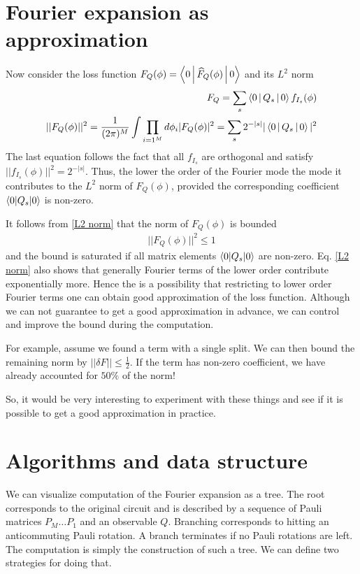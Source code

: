 \documentclass[12 pt]{article}
\begin{document}
\section{Fourier expansion as approximation}
Now consider the loss function $F_Q(\phi)=\Braket{0|\widehat{F}_Q(\phi)|0}$ and its $L^2$ norm
\begin{align}
	F_Q=\sum_s \Braket{0|Q_s|0} f_{I_s}(\phi)\\
	||F_Q(\phi)||^2=\frac{1}{(2\pi)^M}\int \prod_{i=1^M}d\phi_i|F_Q(\phi)|^2=\sum_s 2^{-|s|}|\Braket{0|Q_s|0}|^2  \label{L2 norm}
\end{align}
The last equation follows the fact that all $f_{I_s}$ are orthogonal and satisfy $||f_{I_s}(\phi)||^2=2^{-|s|}$.
Thus, the lower the order of the Fourier mode the mode it contributes to the $L^2$ norm of $F_Q(\phi)$, provided the corresponding coefficient $\braket{0|Q_s|0}$ is non-zero.

It follows from \eqref{L2 norm} that the norm of $F_Q(\phi)$ is bounded 
\begin{align}
	||F_Q(\phi)||^2\le 1
\end{align}
and the bound is saturated if all matrix elements $\braket{0|Q_s|0}$ are non-zero. Eq. \eqref{L2 norm} also shows that generally Fourier terms of the lower order contribute exponentially more. Hence the is a possibility that restricting to lower order Fourier terms one can obtain good approximation of the loss function. Although we can not guarantee to get a good approximation in advance, we can control and improve the bound during the computation.

For example, assume we found a term with a single split. We can then bound the remaining norm by $||\delta F||\le\frac12$. If the term has non-zero coefficient, we have already accounted for $50\%$ of the norm! 

So, it would be very interesting to experiment with these things and see if it is possible to get a good approximation in practice.
\section{Algorithms and data structure}
We can visualize computation of the Fourier expansion as a tree. The root corresponds to the original circuit and is described by a sequence of Pauli matrices $P_M\dots P_1$ and an observable $Q$. Branching corresponds to hitting an anticommuting Pauli rotation. A branch terminates if no Pauli rotations are left. The computation is simply the construction of such a tree. We can define two strategies for doing that.
\end{document}
